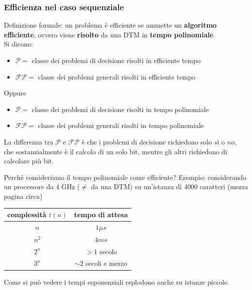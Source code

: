 \subsubsection*{Efficienza nel caso sequenziale}

Definizione formale: un problema è efficiente se ammette un \textbf{algoritmo efficiente}, ovvero viene \textbf{risolto} da una DTM in \textbf{tempo polinomiale}.\\

Si dicono:
\begin{itemize}
	\item $\mathcal{P} =$ classe dei problemi di decisione risolti in efficiente tempo
	\item $\mathcal{FP} =$ classe dei problemi generali risolti in efficiente tempo
\end{itemize}
Oppure
\begin{itemize}
	\item $\mathcal{P} =$ classe dei problemi di decisione risolti in tempo polinomiale
	\item $\mathcal{FP} =$ classe dei problemi generali risolti in tempo polinomiale
\end{itemize}

La differenza tra $\mathcal{P}$ e $\mathcal{FP}$ è che i problemi di decisione richiedono solo $sì$ o $no$, che sostanzialmente è il calcolo di un solo bit, mentre gli altri richiedono di calcolare più bit.\\

\newpage

Perché consideriamo il tempo polinomiale come efficiente? Esempio: considerando un processore da $4$ GHz ($\neq$ da una DTM) su un'istanza di 4000 caratteri (mezza pagina circa)
\begin{center}
	\begin{tabular}{c | c}
		complessità $t(n)$ & tempo di attesa \\
		\hline
		$n$ & $1\mu s$ \\
		$n^2$ & $4 ms$ \\
		$2^n$ & $> 1$ secolo \\
		$3^n$ & $\sim 2$ secoli e mezzo \\
	\end{tabular}
\end{center}


Come si può vedere i tempi esponenziali esplodono anche su istanze piccole.\\

